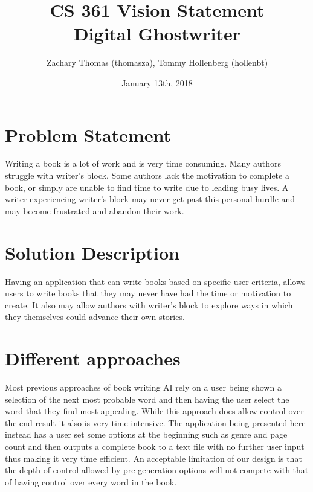 \documentclass[12pt]{article}
\title{CS 361 Vision Statement \\ Digital Ghostwriter}
\author{Zachary Thomas (thomasza), Tommy Hollenberg (hollenbt)}
\date{January 13th, 2018}
\begin{document}
\maketitle
\tableofcontents


\newpage

\section{Problem Statement}

Writing a book is a lot of work and is very time consuming. Many authors struggle with writer's block. Some authors lack the motivation to complete a book, or simply are unable to find time to write due to leading busy lives.\cite{WritingChallenges}
\newline
\newline
A writer experiencing writer's block may never get past this personal hurdle and may become frustrated and abandon their work.

\section{Solution Description}

Having an application that can write books based on specific user criteria, allows users to write books that they may never have had the time or motivation to create. It also may allow authors with writer's block to explore ways in which they themselves could advance their own stories.

\section{Different approaches}

Most previous approaches of book writing AI rely on a user being shown a selection of the next most probable word and then having the user select the word that they find most appealing. While this approach does allow control over the end result it also is very time intensive.\cite{JapaneseAIWritesaNovel}
\newline
\newline
The application being presented here instead has a user set some options at the beginning such as genre and page count and then outputs a complete book to a text file with no further user input thus making it very time efficient.
\newline
\newline
An acceptable limitation of our design is that the depth of control allowed by pre-generation options will not compete with that of having control over every word in the book.
\end{document}
